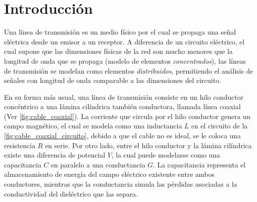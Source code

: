 \section{Introducción}


Una línea de transmisión es un medio físico por el cual se propaga una señal eléctrica desde un emisor a un receptor. A diferencia de un circuito eléctrico, el cual supone que las dimensiones físicas de la red son mucho menores que la longitud de onda que se propaga (modelo de elementos \textit{concentrados}), las líneas de transmisión se modelan como elementos \textit{distribuidos}, permitiendo el análisis de señales con longitud de onda comparable a las dimensiones del circuito. \cite{pozar2012}

En su forma más usual, una línea de transmisión consiste en un hilo conductor concéntrico a una lámina cilíndrica también conductora, llamada línea coaxial (Ver \autoref{fig:cable_coaxial}). La corriente que circula por el hilo conductor genera un campo magnético, el cual se modela como una inductancia $L$ en el circuito de la \autoref{fig:cable_coaxial_circuito}, debido a que el cable no es ideal, se le coloca una resistencia $R$ en serie. Por otro lado, entre el hilo conductor y la lámina cilíndrica existe una diferencia de potencial $V$, la cual puede modelarse como una capacitancia $C$ en paralelo a una conductancia $G$. La capacitancia representa el almacenamiento de energía del campo eléctrico existente entre ambos conductores, mientras que la conductancia simula las pérdidas asociadas a la conductividad del dieléctrico que las separa.

